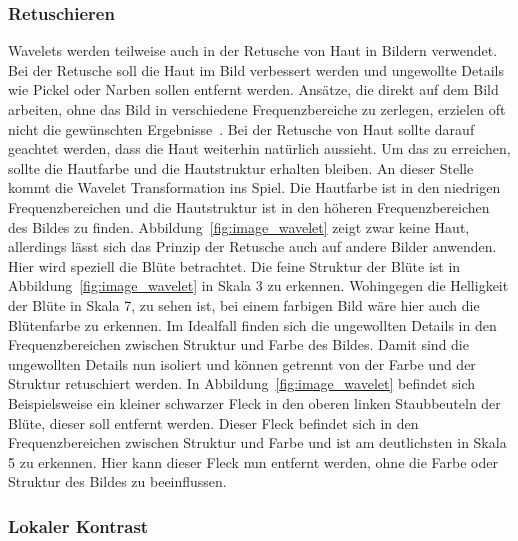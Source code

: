 \documentclass[12pt, a4paper, ngerman]{article}
\begin{document}
\subsubsection{Retuschieren}

Wavelets werden teilweise auch in der Retusche von Haut in Bildern verwendet.
Bei der Retusche soll die Haut im Bild verbessert werden und ungewollte Details
wie Pickel oder Narben sollen entfernt werden.
Ansätze, die direkt auf dem Bild arbeiten,
ohne das Bild in verschiedene Frequenzbereiche zu zerlegen,
erzielen oft nicht die gewünschten Ergebnisse~\cite{skin_retouching}.
Bei der Retusche von Haut sollte darauf geachtet werden,
dass die Haut weiterhin natürlich aussieht.
Um das zu erreichen, sollte die Hautfarbe und die Hautstruktur erhalten bleiben.
An dieser Stelle kommt die Wavelet Transformation ins Spiel.
Die Hautfarbe ist in den niedrigen Frequenzbereichen
und die Hautstruktur ist in den höheren Frequenzbereichen des Bildes zu finden.
Abbildung~\ref{fig:image_wavelet} zeigt zwar keine Haut, 
allerdings lässt sich das Prinzip der Retusche auch auf andere Bilder anwenden.
Hier wird speziell die Blüte betrachtet.
Die feine Struktur der Blüte ist in Abbildung~\ref{fig:image_wavelet} in Skala 3 zu erkennen.
Wohingegen die Helligkeit der Blüte in Skala 7, zu sehen ist,
bei einem farbigen Bild wäre hier auch die Blütenfarbe zu erkennen.
Im Idealfall finden sich die ungewollten Details
in den Frequenzbereichen zwischen Struktur und Farbe des Bildes.
Damit sind die ungewollten Details nun isoliert und können getrennt von
der Farbe und der Struktur retuschiert werden.
In Abbildung~\ref{fig:image_wavelet} befindet sich Beispielsweise ein kleiner schwarzer Fleck
in den oberen linken Staubbeuteln der Blüte, dieser soll entfernt werden.
Dieser Fleck befindet sich in den Frequenzbereichen zwischen Struktur und Farbe
und ist am deutlichsten in Skala 5 zu erkennen.
Hier kann dieser Fleck nun entfernt werden,
ohne die Farbe oder Struktur des Bildes zu beeinflussen.

\subsubsection{Lokaler Kontrast}
\end{document}
